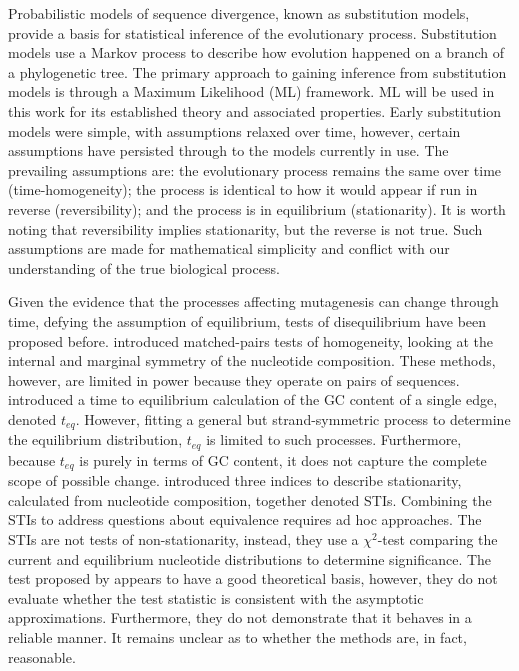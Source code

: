 Probabilistic models of sequence divergence, known as substitution models, provide a basis for statistical inference of the evolutionary process. Substitution models use a Markov process to describe how evolution happened on a branch of a phylogenetic tree. The primary approach to gaining inference from substitution models is through a Maximum Likelihood (ML) framework. ML will be used in this work for its established theory and associated properties. Early substitution models were simple, with assumptions relaxed over time, however, certain assumptions have persisted through to the models currently in use. The prevailing assumptions are: the evolutionary process remains the same over time (time-homogeneity); the process is identical to how it would appear if run in reverse (reversibility); and the process is in \gls{equilibrium} (stationarity). It is worth noting that reversibility implies stationarity, but the reverse is not true. Such assumptions are made for mathematical simplicity and conflict with our understanding of the true biological process. 

Given the evidence that the processes affecting mutagenesis can change through time, defying the assumption of equilibrium, tests of disequilibrium have been proposed before. \cite{Ababneh2006Matched-pairsSequences} introduced matched-pairs tests of homogeneity, looking at the internal and marginal symmetry of the nucleotide composition. These methods, however, are limited in power because they operate on pairs of sequences. \cite{Singh2009StrongDrosophila} introduced a time to equilibrium calculation of the GC content of a single edge, denoted $t_{eq}$. However, fitting a general but strand-symmetric process to determine the equilibrium distribution, $t_{eq}$ is limited to such processes. Furthermore, because $t_{eq}$ is purely in terms of GC content, it does not capture the complete scope of possible change. \cite{Squartini2008QuantifyingProcess} introduced three indices to describe stationarity, calculated from nucleotide composition, together denoted STIs. Combining the STIs to address questions about equivalence requires ad hoc approaches. The STIs are not tests of non-stationarity, instead, they use a $\chi^2$-test comparing the current and equilibrium nucleotide distributions to determine significance. The test proposed by \cite{Squartini2008QuantifyingProcess} appears to have a good theoretical basis, however, they do not evaluate whether the test statistic is consistent with the asymptotic approximations. Furthermore, they do not demonstrate that it behaves in a reliable manner. It remains unclear as to whether the methods are, in fact, reasonable. 

